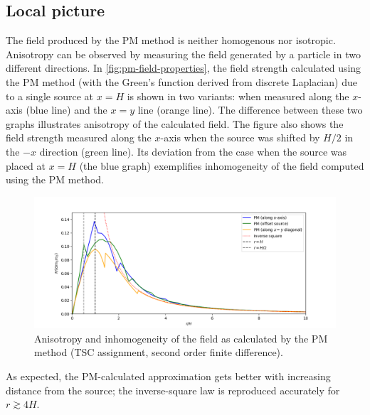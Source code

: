 \subsection{Local picture}
The field produced by the PM method is neither homogenous nor isotropic.
Anisotropy can be observed by measuring the field generated by a particle in two different directions.
In \autoref{fig:pm-field-properties}, the field strength calculated using the PM method (with the Green's function derived from discrete Laplacian) due to a single source at $x = H$ is shown in two variants: when measured along the $x$-axis (blue line) and the $x=y$ line (orange line).
The difference between these two graphs illustrates anisotropy of the calculated field.
The figure also shows the field strength measured along the $x$-axis when the source was shifted by $H/2$ in the $-x$ direction (green line).
Its deviation from the case when the source was placed at $x=H$ (the blue graph) exemplifies inhomogeneity of the field computed using the PM method.
\begin{figure}[htp]
    \centering
    \includegraphics[scale=0.55]{chapters/pm-method/img/pm-field-combined.png}
    \caption{Anisotropy and inhomogeneity of the field as calculated by the PM method (TSC assignment, second order finite difference).}
    \label{fig:pm-field-properties}
\end{figure}
As expected, the PM-calculated approximation gets better with increasing distance from the source;
the inverse-square law is reproduced accurately for $r \gtrsim 4H$.

